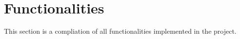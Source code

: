 \section{Functionalities}
This section is a compliation of all functionalities implemented in the project.









